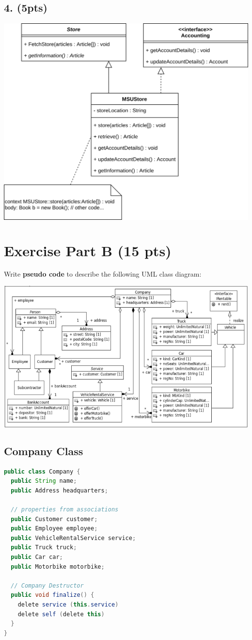 \documentclass[12pt]{article}
\begin{document}
\subsection*{4. (5pts)}
\includegraphics[width=\textwidth]{HW-2-diagrams-Part-A-4.png}

\newpage

\section*{Exercise Part B (15 pts)}

Write \textbf{pseudo code} to describe the following UML class diagram:

\includegraphics[width=\textwidth]{HW-2-B-image.png}
\subsection*{Company Class}
\begin{lstlisting}[language=Java]
public class Company {
  public String name;
  public Address headquarters;
  
  // properties from associations
  public Customer customer;
  public Employee employee;
  public VehicleRentalService service;
  public Truck truck;
  public Car car;
  public Motorbike motorbike;

  // Company Destructor
  public void finalize() {
    delete service (this.service)
    delete self (delete this)
  }
}
\end{lstlisting}
\end{document}
